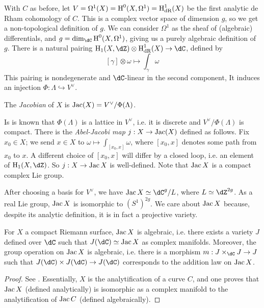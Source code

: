 With $C$ as before, let $V=\Omega^1(X)=\operatorname{H}^0(X,\Omega^1)=\operatorname{H}^1_\text{dR}(X)$ be 
the first analytic de Rham cohomology of $C$. 
This is a complex vector space of dimension $g$, so we get a non-topological 
definition of $g$. We can consider $\Omega^1$ as the sheaf of (algebraic) 
differentials, and $g=\dim_\dC\h^0(X,\Omega^1)$, giving us a purely algebraic 
definition of $g$. There is a natural pairing 
$\h_1(X,\dZ)\otimes\h_\text{dR}^1(X)\to\dC$, defined by 
\[
  [\gamma]\otimes \omega \mapsto \int_\gamma \omega
\]
This pairing is nondegenerate and $\dC$-linear in the second component, 
It induces an injection $\Phi:\Lambda\hookrightarrow V^\vee$. 

\begin{definition}[analytic]
The \emph{Jacobian} of $X$ is $\operatorname{Jac}(X)=V^\vee/\Phi(\Lambda)$. 
\end{definition}

Is is known that $\Phi(\Lambda)$ is a lattice in $V^\vee$, i.e. it is discrete 
and $V^\vee/\Phi(\Lambda)$ is compact. There is the \emph{Abel-Jacobi map} 
$j:X\to \operatorname{Jac}(X)$ defined as follows. Fix $x_0\in X$; we send $x\in X$ to 
$\omega\mapsto \int_{[x_0,x]} \omega$, where $[x_0,x]$ denotes some path from 
$x_0$ to $x$. A different choice of $[x_0,x]$ will differ by a closed loop, 
i.e. an element of $\h_1(X,\dZ)$. So $j:X\to\operatorname{Jac} X$ is well-defined. Note 
that $\operatorname{Jac} X$ is a compact complex Lie group. 

After choosing a basis for $V^\vee$, we have $\jac X\simeq \dC^g/L$, where 
$L\simeq \dZ^{2 g}$. As a real Lie group, $\operatorname{Jac} X$ is isomorphic to 
$(S^1)^{2 g}$. 
We care about $\operatorname{Jac} X$ because, despite its analytic definition, it is in fact 
a projective variety.

\begin{theorem}
For $X$ a compact Riemann surface, $\operatorname{Jac} X$ is algebraic, i.e. there exists a 
variety $J$ defined over $\dC$ such that $J(\dC)\simeq\jac X$ as 
complex manifolds. Moreover, the group operation on $\operatorname{Jac} X$ is algebraic, 
i.e. there is a morphism $m:J\times_\dC J\to J$ such that 
$J(\dC)\times J(\dC)\to J(\dC)$ corresponds to the 
addition law on $\operatorname{Jac} X$. 
\end{theorem}
\begin{proof}
See \cite[I.18]{mi-av}. Essentially, $X$ is the analytification of a curve $C$, 
and one proves that $\operatorname{Jac} X$ (defined analytically) is isomorphic as a complex 
manifold to the analytification of $\operatorname{Jac} C$ (defined algebraically). 
\end{proof}


